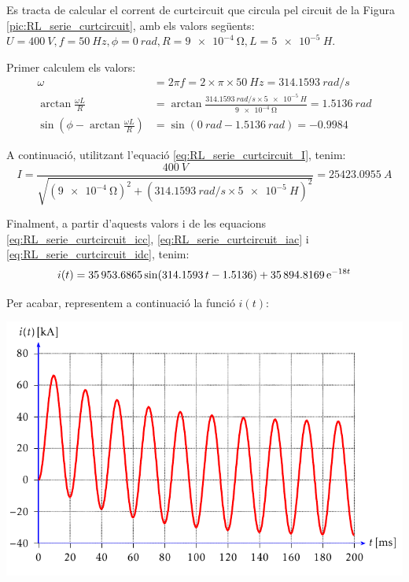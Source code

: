 \begin{exemple}
    Es tracta de calcular el corrent de curtcircuit que circula pel circuit de la Figura \vref{pic:RL_serie_curtcircuit}, amb els valors seg\"{u}ents: $U=\SI{400}{V}, f=\SI{50}{Hz}, \phi=\SI{0}{rad}, R=\SI{9e-4}{\ohm}, L=\SI{5e-5}{H}$.

    Primer calculem els valors:
    \begin{align*}
        \omega &= 2\pi f = 2\times\pi\times\SI{50}{Hz} = \SI{314,1593}{rad/s} \\[3mm]
        \arctan\frac{\omega L}{R} &= \arctan\frac{\SI{314,1593}{rad/s}\times\SI{5e-5}{H}}{\SI{9e-4}{\ohm}} =
        \SI{1,5136}{rad} \\[3mm]
        \sin\left(\phi - \arctan\frac{\omega L}{R}\right) &= \sin(\SI{0}{rad} - \SI{1,5136}{rad})= \num{-0,9984}
    \end{align*}

    A continuaci\'{o}, utilitzant l'equaci\'{o} \eqref{eq:RL_serie_curtcircuit_I}, tenim:
    \[
        I=\frac{\SI{400}{V}}{\sqrt{\left(\SI{9e-4}{\ohm}\right)^2+\left(\SI{314,1593}{rad/s}\times \SI{5e-5}{H}\right)^2}} =
        \SI{25423,0955}{A}
    \]

    Finalment, a partir d'aquests valors i de les equacions \eqref{eq:RL_serie_curtcircuit_icc}, \eqref{eq:RL_serie_curtcircuit_iac} i \eqref{eq:RL_serie_curtcircuit_idc}, tenim:
    \[
        i(t) = \num{35953,6865}\sin(\num{314,1593}\,t-\num{1,5136}) + \num{35894,8169}\,\mathrm{e}^{-18 t}
    \]

    Per acabar, representem a continuaci\'{o} la funci\'{o} $i(t)$:
    \begin{center}
        \includegraphics{Imatges/Cap-Fonaments-Exemple-R-L.pdf}
    \end{center}
\end{exemple} 